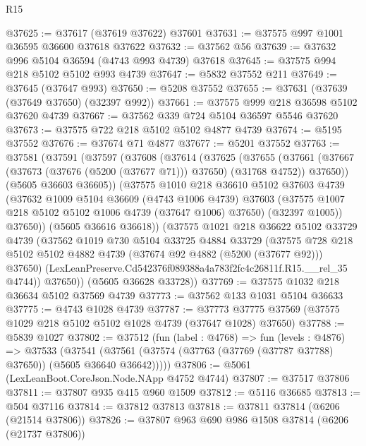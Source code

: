 \begin{lexlean}{R15}
\begin{coremodule}
{{{{{{{{{{{@37625 := @37617 (@37619 @37622) @37601
@37631 := @37575 @997 @1001 @36595 @36600 @37618 @37622
@37632 := @37562 @56
@37639 := @37632 @996 @5104 @36594 (@4743 @993 @4739) @37618
@37645 := @37575 @994 @218 @5102 @5102 @993 @4739
@37647 := @5832 @37552 @211
@37649 := @37645 (@37647 @993)
@37650 := @5208 @37552
@37655 := @37631 (@37639 (@37649 @37650) (@32397 @992))
@37661 := @37575 @999 @218 @36598 @5102 @37620 @4739
@37667 := @37562 @339 @724 @5104 @36597 @5546 @37620
@37673 := @37575 @722 @218 @5102 @5102 @4877 @4739
@37674 := @5195 @37552
@37676 := @37674 @71 @4877
@37677 := @5201 @37552
@37763 := @37581
    (@37591
      (@37597
        (@37608
          (@37614
            (@37625
              (@37655
                (@37661
                  (@37667 (@37673 (@37676 (@5200 (@37677 @71))) @37650) (@31768 @4752))
                  @37650))
              (@5605 @36603 @36605))
            (@37575
              @1010
              @218
              @36610
              @5102
              @37603
              @4739
              (@37632
                @1009
                @5104
                @36609
                (@4743 @1006 @4739)
                @37603
                (@37575 @1007 @218 @5102 @5102 @1006 @4739 (@37647 @1006) @37650)
                (@32397 @1005))
              @37650))
          (@5605 @36616 @36618))
        (@37575
          @1021
          @218
          @36622
          @5102
          @33729
          @4739
          (@37562
            @1019
            @730
            @5104
            @33725
            @4884
            @33729
            (@37575
              @728
              @218
              @5102
              @5102
              @4882
              @4739
              (@37674 @92 @4882 (@5200 (@37677 @92)))
              @37650)
            (LexLeanPreserve.Cd542376f089388a4a783f2fc4c26811f.R15.__rel_35 @4744))
          @37650))
      (@5605 @36628 @33728))
@37769 := @37575 @1032 @218 @36634 @5102 @37569 @4739
@37773 := @37562 @133 @1031 @5104 @36633
@37775 := @4743 @1028 @4739
@37787 := @37773 @37775 @37569 (@37575 @1029 @218 @5102 @5102 @1028 @4739 (@37647 @1028) @37650)
@37788 := @5839 @1027
@37802 := @37512
    (fun (label : @4768) =>
    fun (levels : @4876) =>
    @37533
      (@37541 (@37561 (@37574 (@37763 (@37769 (@37787 @37788) @37650)) (@5605 @36640 @36642)))))
@37806 := @5061 (LexLeanBoot.CoreJson.Node.NApp @4752 @4744)
@37807 := @37517 @37806
@37811 := @37807 @935 @415 @960 @1509
@37812 := @5116 @36685
@37813 := @504 @37116
@37814 := @37812 @37813
@37818 := @37811 @37814 (@6206 (@21514 @37806))
@37826 := @37807 @963 @690 @986 @1508 @37814 (@6206 (@21737 @37806))
}}}}}}}}}}}
\end{coremodule}
\end{lexlean}
